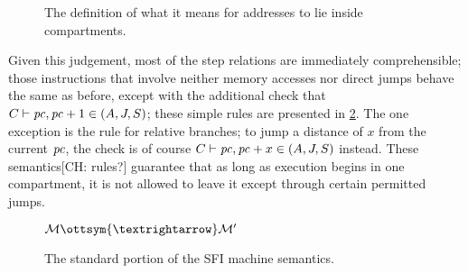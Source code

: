 \documentclass[12pt]{amsart}
\newif\ifdraft\drafttrue
\newcommand{\comm}[3]{\ifdraft\textcolor{#1}{[#2: #3]}\fi}
\newcommand{\ch}[1]{\comm{dkgreen}{CH}{#1}} %
\begin{document}
\begin{figure}
  \ottdefninXXcompartment{}
  \par\vspace{\baselineskip}
  \ottdefnmanyXXinXXcompartment{}
  \vspace{-\baselineskip}
  \caption{The definition of what it means for addresses to lie inside
    compartments.}
  \label{fig:in-compartment}
\end{figure}

Given this judgement, most of the step relations are immediately comprehensible;
those instructions that involve neither memory accesses nor direct jumps behave
the same as before, except with the additional check that $C \vdash
\mathit{pc},\mathit{pc}+1 \in (A, J, S)$; these simple rules
are presented in \cref{fig:sfi-step-simple}.  The one exception is the
 rule for relative branches; to jump a distance
of $x$ from the current $\mathit{pc}$, the check is of course $C \vdash
\mathit{pc},\mathit{pc}+x \in (A, J, S)$ instead.  These
semantics\ch{rules?}
guarantee that as long as execution begins in one compartment, it is
not allowed to leave it except through certain permitted jumps.

\begin{figure}
  \begin{ottdefnblock}{$\mathcal{M} \ottsym{→} \mathcal{M}'$}
                      {}
    \ottusedrule{\ottdrulestepXXnop{}}\medskip
    \ottusedrule{\ottdrulestepXXconst{}}\medskip
    \ottusedrule{\ottdrulestepXXmov{}}\medskip
    \ottusedrule{\ottdrulestepXXbinop{}}\medskip
    \ottusedrule{\ottdrulestepXXbnzXXzero{}}\medskip
    \ottusedrule{\ottdrulestepXXbnzXXnonzero{}}
  \end{ottdefnblock}\vspace{-\baselineskip}
  \caption{The standard portion of the SFI machine semantics.}
  \label{fig:sfi-step-simple}
\end{figure}
\end{document}
